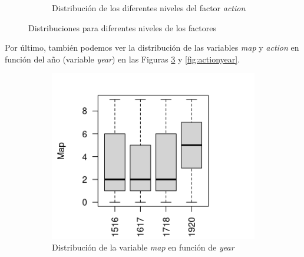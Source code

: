 \begin{figure}[!tbp]
\begin{subfigure}[b]{0.49\textwidth}
    \caption{Distribución de los diferentes niveles del factor \emph{action}}
    \label{fig:yearaction}
  \end{subfigure}
  \caption{Distribuciones para diferentes niveles de los factores}
\end{figure}

Por último, también podemos ver la distribución de las variables \emph{map} y \emph{action} en función del año (variable \emph{year}) en las Figuras \ref{fig:mapyear} y \ref{fig:actionyear}.

\begin{figure}[!tbp]
  \begin{subfigure}[b]{0.49\textwidth}
    \includegraphics[width=\textwidth, height=\textwidth]{imagenes/Rplot03.png}
    \caption{Distribución de la variable \emph{map} en función de \emph{year}}
    \label{fig:mapyear}
  \end{subfigure}
  \hfill
  \begin{subfigure}[b]{0.49\textwidth}

\end{subfigure}
\end{figure}
